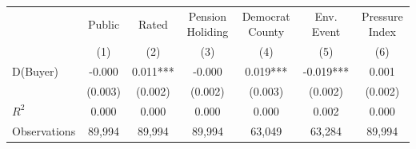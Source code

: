 {
\def\sym#1{\ifmmode^{#1}\else\(^{#1}\)\fi}
\begin{tabular}{l*{6}{c}}
\toprule
                    &\multicolumn{1}{c}{Public}&\multicolumn{1}{c}{Rated}&\multicolumn{1}{c}{Pension Holiding}&\multicolumn{1}{c}{Democrat County}&\multicolumn{1}{c}{Env. Event}&\multicolumn{1}{c}{Pressure Index}\\\cmidrule(lr){2-2}\cmidrule(lr){3-3}\cmidrule(lr){4-4}\cmidrule(lr){5-5}\cmidrule(lr){6-6}\cmidrule(lr){7-7}
                    &\multicolumn{1}{c}{(1)}   &\multicolumn{1}{c}{(2)}   &\multicolumn{1}{c}{(3)}   &\multicolumn{1}{c}{(4)}   &\multicolumn{1}{c}{(5)}   &\multicolumn{1}{c}{(6)}   \\
\midrule
D(Buyer)            &      -0.000   &       0.011***&      -0.000   &       0.019***&      -0.019***&       0.001   \\
                    &     (0.003)   &     (0.002)   &     (0.002)   &     (0.003)   &     (0.002)   &     (0.002)   \\
\midrule
\(R^{2}\)           &       0.000   &       0.000   &       0.000   &       0.000   &       0.002   &       0.000   \\
Observations        &      89,994   &      89,994   &      89,994   &      63,049   &      63,284   &      89,994   \\
\bottomrule
\end{tabular}
}
